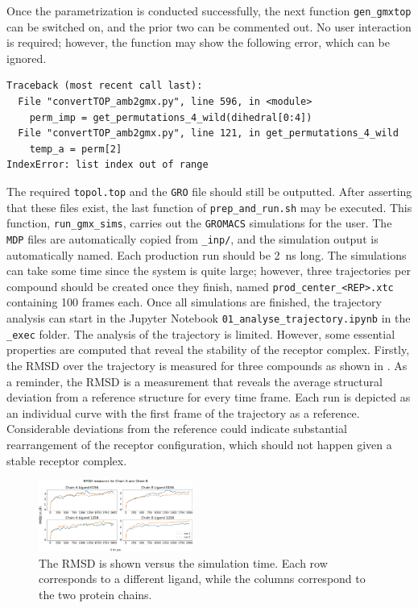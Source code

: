 \documentclass[9pt,tutorial]{livecoms}
\newcommand{\code}[1]{\colorbox{light-gray}{\texttt{#1}}}
\begin{document}
Once the parametrization is conducted successfully, the next function \code{gen\_gmxtop} can be switched on, and the prior two can be commented out. No user interaction is required; however, the function may show the following error, which can be ignored.
\begin{lstlisting}
Traceback (most recent call last):
  File "convertTOP_amb2gmx.py", line 596, in <module>
    perm_imp = get_permutations_4_wild(dihedral[0:4])
  File "convertTOP_amb2gmx.py", line 121, in get_permutations_4_wild
    temp_a = perm[2]
IndexError: list index out of range
\end{lstlisting}
The required \code{topol.top} and the \texttt{GRO} file should still be outputted. After asserting that these files exist, the last function of \code{prep\_and\_run.sh} may be executed. This function, \code{run\_gmx\_sims}, carries out the \texttt{GROMACS} simulations for the user. The \texttt{MDP} files are automatically copied from \code{\_inp/}, and the simulation output is automatically named. Each production run should be \SI{2}{\nano\second} long. The simulations can take some time since the system is quite large; however, three trajectories per compound should be created once they finish, named \code{prod\_center\_<REP>.xtc} containing 100 frames each. Once all simulations are finished, the trajectory analysis can start in the Jupyter Notebook \code{01\_analyse\_trajectory.ipynb} in the \code{\_exec} folder. The analysis of the trajectory is limited. However, some essential properties are computed that reveal the stability of the receptor complex. Firstly, the RMSD over the trajectory is measured for three compounds as shown in . As a reminder, the RMSD is a measurement that reveals the average structural deviation from a reference structure for every time frame. Each run is depicted as an individual curve with the first frame of the trajectory as a reference. Considerable deviations from the reference could indicate substantial rearrangement of the receptor configuration, which should not happen given a stable receptor complex. 

\begin{figure}[H]
    \centering
    \includegraphics[width=0.45\textwidth]{figures/RMSD_vs_time.pdf}
    \caption{The RMSD is shown versus the simulation time. Each row corresponds to a different ligand, while the columns correspond to the two protein chains.}
    \label{fig:6_rmsdvstime}
\end{figure}
\end{document}
